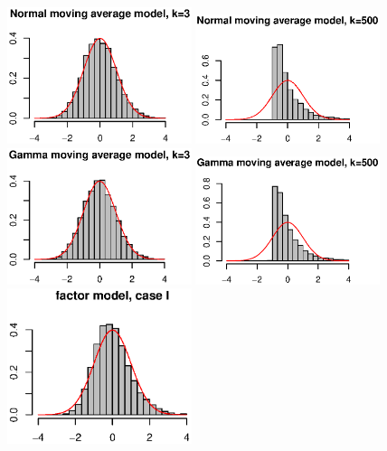 \documentclass[3p]{elsarticle}
\theoremstyle{plain}
\theoremstyle{definition}
\theoremstyle{remark}
\begin{document}
\begin{figure}[htbp]
    \centering
    \includegraphics[width=0.48\textwidth]{Fig2}
    \includegraphics[width=0.48\textwidth]{Fig3}\\
    \includegraphics[width=0.48\textwidth]{Fig4}
    \includegraphics[width=0.48\textwidth]{Fig5}\\
    \includegraphics[width=0.48\textwidth]{Fig6}

\end{figure}
\end{document}

